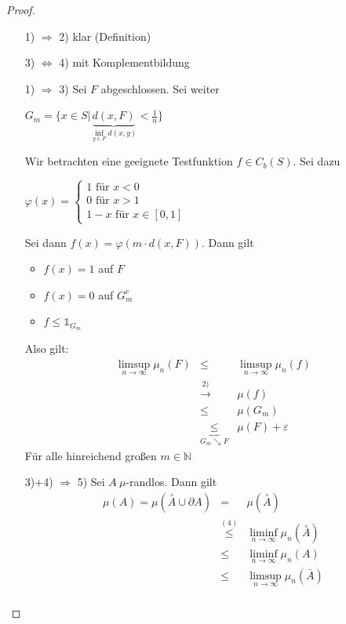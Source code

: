 \documentclass[10pt,a4paper]{report}
\newcommand{\N}{\mathbb{N}}
\numberwithin{equation}{section}
\numberwithin{figure}{section}
\theoremstyle{plain}
\theoremstyle{definition}
\theoremstyle{remark}
\theoremstyle{plain}
\newcommand{\1}{ \mathbb{1} } %
\begin{document}
\begin{proof} \ 
  \begin{itemize}
  \item[1) $\Rightarrow$ 2)] klar (Definition)
  \item[3) $\Leftrightarrow$ 4)] mit Komplementbildung
  \item[1) $\Rightarrow$ 3)] Sei $F$ abgeschlossen. Sei weiter
    \begin{center}
      $G_m=\{x \in S|\underbrace{d(x,F)}_{\inf\limits_{y \in
          F}d(x,y)}<\frac{1}{n}\}$
    \end{center}
    Wir betrachten eine geeignete Testfunktion $f \in C_b(S)$. Sei
    dazu
    \begin{center}
      $\varphi(x)=\begin{cases}
        1 \text{ für } x < 0\\
        0 \text{ für } x > 1\\
        1-x \text{ für } x \in [0,1]
      \end{cases}$
    \end{center}
    Sei dann $f(x)=\varphi(m\cdot d(x,F))$. Dann gilt
    \begin{itemize}
    \item $f(x)=1$ auf $F$
    \item $f(x)=0$ auf $G_m^c$
    \item $f \leq \1_{G_m}$
    \end{itemize}
    Also gilt:
    \begin{eqnarray*}
      \limsup\limits_{n \to \infty} \mu_n(F) &\leq & \limsup\limits_{n \to \infty} \mu_n(f)\\
      &\overset{2)}{\to }& \mu(f)\\
      &\leq & \mu(G_m)\\
      &\underbrace{\leq}_{G_m \searrow F}& \mu(F)+\varepsilon
    \end{eqnarray*}
    Für alle hinreichend großen $m \in \N$
    \item[3)+4) $\Rightarrow$ 5)] Sei $A ~ \mu$-randlos. Dann gilt
    \begin{eqnarray*}
      \mu(A)=\mu(\overset{\circ}{A}\cup \partial A)&=&\mu(\overset{\circ}{A})\\
      & \overset{(4)}{\leq}& \liminf\limits_{n \to \infty} \mu_n(\overset{\circ}{A})\\
      & \leq & \liminf\limits_{n \to \infty} \mu_n(A)\\
      & \leq & \limsup\limits_{n \to \infty} \mu_n(\bar{A})\\ 

\end{eqnarray*}
\end{itemize}
\end{proof}
\end{document}
